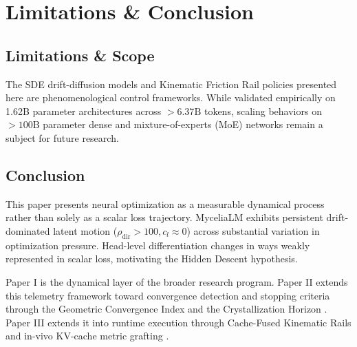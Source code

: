 \documentclass[11pt,twocolumn]{article}
\begin{document}
\section{Limitations \& Conclusion}
\subsection{Limitations \& Scope}
The SDE drift-diffusion models and Kinematic Friction Rail policies presented here are phenomenological control frameworks. While validated empirically on 1.62B parameter architectures across $>6.37\text{B}$ tokens, scaling behaviors on $>100\text{B}$ parameter dense and mixture-of-experts (MoE) networks remain a subject for future research.

\subsection{Conclusion}
This paper presents neural optimization as a measurable dynamical process rather than solely as a scalar loss trajectory. MyceliaLM exhibits persistent drift-dominated latent motion ($\rho_{\mathrm{dir}} > 100, c_l \approx 0$) across substantial variation in optimization pressure. Head-level differentiation changes in ways weakly represented in scalar loss, motivating the Hidden Descent hypothesis.

Paper I is the dynamical layer of the broader research program. Paper II extends this telemetry framework toward convergence detection and stopping criteria through the Geometric Convergence Index and the Crystallization Horizon \cite{solis2026gci}. Paper III extends it into runtime execution through Cache-Fused Kinematic Rails and in-vivo KV-cache metric grafting \cite{solis2026cfkr}.
\end{document}
